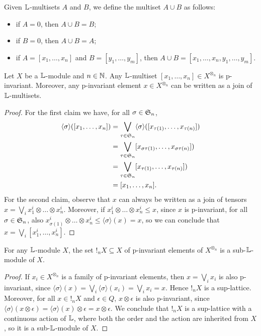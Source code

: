 Given $\mathbb{L}$-multisets $A$ and $B$, we define the multiset $A\cup B$ as follows:
\begin{itemize}
\item if $A=0$, then $A\cup B=B$;
\item if $B=0$, then $A\cup B=A$;
\item if $A=[x_{1},\dots, x_{n}]$ and $B=[y_{1},\dots, y_{m}]$, then $A\cup B=[x_{1},\dots, x_{n},y_{1},\dots, y_{m}]$.


\end{itemize}

\begin{proposition}
Let $X$ be a $\mathbb{L}$-module and $n\in \mathbb{N}$. Any $\mathbb{L}$-multiset $[x_{1},\dots, x_{n}]\in X^{\otimes_{n}}$ is p-invariant. Moreover, any p-invariant element $x\in X^{\otimes_{n}}$ can be written as 
a join of $\mathbb{L}$-multisets.
\end{proposition}
\begin{proof}
For the first claim we have, for all $\sigma\in \mathfrak{S}_{n}$, 
\begin{align*}
\langle \sigma \rangle ([x_{1},\dots, x_{n}]) & = 
\bigvee_{\tau\in \mathfrak{S}_{n}}\langle \sigma \rangle ([x_{\tau(1)},\dots, x_{\tau(n)}])\\
 & = 
\bigvee_{\tau\in \mathfrak{S}_{n}}[x_{\sigma\tau(1)},\dots, x_{\sigma\tau(n)}])\\
 & = 
\bigvee_{\tau\in \mathfrak{S}_{n}}[x_{\tau(1)},\dots, x_{\tau(n)}])\\
&= [x_{1},\dots, x_{n}].
\end{align*}
For the second claim, observe that $x$ can always be written as a join of tensors $x=\bigvee_{i}x_{1}^{i}\otimes \dots \otimes x_{n}^{i}$. Moreover, 
if $x_{1}^{i}\otimes \dots \otimes x_{n}^{i}\leq x$, since $x$ is p-invariant, for all $\sigma \in \mathfrak{S}_{n}$, also
$x_{\sigma(1)}^{i}\otimes \dots \otimes x_{n}^{i}\leq \langle \sigma\rangle(x)=x$, so we can conclude that 
$x=\bigvee_{i}[x_{1}^{i},\dots, x_{n}^{i}]$.
\end{proof}


\begin{proposition}
For any $\mathbb{L}$-module $X$, the set $!_{n}X\subseteq X$ of p-invariant elements of $X^{\otimes_{n}}$ is a sub-$\mathbb{L}$-module of $X$.
\end{proposition}
\begin{proof}
If $x_{i}\in X^{\otimes_{n}}$ is a family of p-invariant elements, then 
$x=\bigvee_{i}x_{i}$ is also p-invariant, since $\langle \sigma\rangle (x)=\bigvee_{i}\langle \sigma \rangle (x_{i})=\bigvee_{i}x_{i}=x$. Hence $!_{n}X$ is a sup-lattice.
Moreover, for all $x\in !_{n}X$ and $\epsilon \in Q$, 
$x\otimes \epsilon$ is also p-invariant, since $\langle \sigma \rangle (x\otimes \epsilon)= \langle \sigma \rangle (x)\otimes \epsilon=x\otimes \epsilon$. We conclude that $!_{n}X$ is a sup-lattice with a continuous action of $\mathbb{L}$, where both the order and the action are inherited from $X$, so it is a sub-$\mathbb{L}$-module of $X$.
\end{proof}


